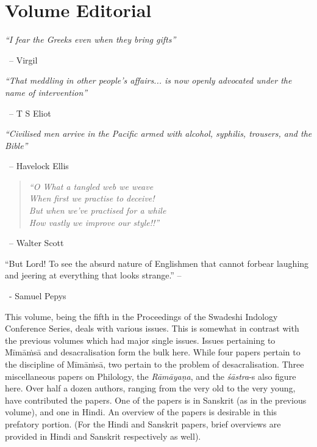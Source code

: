 
\chapter*{Volume Editorial}

\begin{myquote}
\textit{“I fear the Greeks even when they bring gifts”}
\end{myquote}


~\hfill – Virgil

\begin{myquote}
\textit{“That meddling in other people’s affairs... is now openly advocated under the name of intervention”}
\end{myquote}


~\hfill – T S Eliot

\begin{myquote}
\textit{“Civilised men arrive in the Pacific armed with alcohol, syphilis, trousers, and the Bible”}
\end{myquote}


~\hfill – Havelock Ellis

\begin{verse}
\textit{“O What a tangled web we weave\\ When first we practise to deceive!\\ But when we’ve practised for a while\\ How vastly we improve our style!!”}
\end{verse}


~\hfill – Walter Scott

\begin{myquote}
“But Lord! To see the absurd nature of Englishmen that cannot forbear laughing and jeering at everything that looks strange.” –
\end{myquote}


~\hfill - Samuel Pepys

This volume, being the fifth in the Proceedings of the Swadeshi Indology Conference Series, deals with various issues. This is somewhat in contrast with the previous volumes which had major single issues. Issues pertaining to Mīmāṁsā and desacralisation form the bulk here. While four papers pertain to the discipline of Mīmāṁsā, two pertain to the problem of desacralisation. Three miscellaneous papers on Philology, the \textit{Rāmāyaṇa}, and the \textit{śāstra}-s also figure here. Over half a dozen authors, ranging from the very old to the very young, have contributed the papers. One of the papers is in Sanskrit (as in the previous volume), and one in Hindi. An overview of the papers is desirable in this prefatory portion. (For the Hindi and Sanskrit papers, brief overviews are provided in Hindi and Sanskrit respectively as well).

